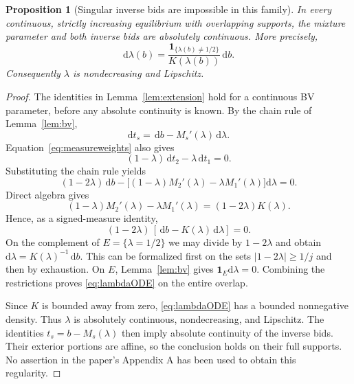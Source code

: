 \documentclass[11pt,a4paper]{article}
\numberwithin{equation}{section}
\newtheorem{proposition}[theorem]{Proposition}
\theoremstyle{definition}
\theoremstyle{remark}
\newcommand{\dd}{\,\mathrm d}
\newcommand{\ind}{\mathbf 1}
\begin{document}
\begin{proposition}[Singular inverse bids are impossible in this family]
\label{prop:regularity}
In every continuous, strictly increasing equilibrium with overlapping supports, the mixture parameter and both inverse bids are absolutely continuous. More precisely,
\begin{equation}
\label{eq:lambdaODE}
 \mathrm d\lambda(b)
 =\frac{\ind_{\{\lambda(b)\ne1/2\}}}{K(\lambda(b))}\dd b.
\end{equation}
Consequently $\lambda$ is nondecreasing and Lipschitz.
\end{proposition}
\begin{proof}
The identities in Lemma~\ref{lem:extension} hold for a continuous BV parameter, before any absolute continuity is known. By the chain rule of Lemma~\ref{lem:bv},
\[
 \mathrm dt_s=\dd b-M_s'(\lambda)\,\mathrm d\lambda.
\]
Equation~\eqref{eq:measureweights} also gives
\[
 (1-\lambda)\,\mathrm dt_2-\lambda\,\mathrm dt_1=0.
\]
Substituting the chain rule yields
\[
 (1-2\lambda)\dd b
 -\bigl[(1-\lambda)M_2'(\lambda)-\lambda M_1'(\lambda)\bigr]
 \mathrm d\lambda=0.
\]
Direct algebra gives
\begin{equation}
\label{eq:factorlambda}
 (1-\lambda)M_2'(\lambda)-\lambda M_1'(\lambda)
 =(1-2\lambda)K(\lambda).
\end{equation}
Hence, as a signed-measure identity,
\begin{equation}
\label{eq:DAEmeasure}
 (1-2\lambda)\,[\dd b-K(\lambda)\,\mathrm d\lambda]=0.
\end{equation}
On the complement of $E=\{\lambda=1/2\}$ we may divide by $1-2\lambda$ and obtain $\mathrm d\lambda=K(\lambda)^{-1}\dd b$. This can be formalized first on the sets $|1-2\lambda|\ge1/j$ and then by exhaustion. On $E$, Lemma~\ref{lem:bv} gives $\ind_E\mathrm d\lambda=0$. Combining the restrictions proves \eqref{eq:lambdaODE} on the entire overlap.

Since $K$ is bounded away from zero, \eqref{eq:lambdaODE} has a bounded nonnegative density. Thus $\lambda$ is absolutely continuous, nondecreasing, and Lipschitz. The identities $t_s=b-M_s(\lambda)$ then imply absolute continuity of the inverse bids. Their exterior portions are affine, so the conclusion holds on their full supports. No assertion in the paper's Appendix A has been used to obtain this regularity.
\end{proof}
\end{document}

